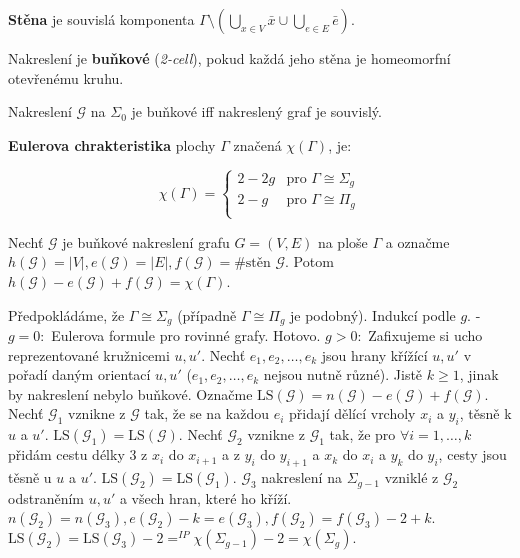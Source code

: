 \begin{definice}
	\textbf{Stěna} je souvislá komponenta $\Gamma \setminus (\bigcup_{x \in V} \bar{x} \cup \bigcup_{e \in E} \bar{e})$.
\end{definice}

\begin{definice}
	Nakreslení je \textbf{buňkové} (\textit{2-cell}), pokud každá jeho stěna je homeomorfní otevřenému kruhu.
\end{definice}

\begin{fakt}
	Nakreslení $\mathcal{G}$ na $\Sigma_{0}$ je buňkové iff nakreslený graf je souvislý.
\end{fakt}

\begin{definice}
	\textbf{Eulerova chrakteristika} plochy $\Gamma$ značená $\chi (\Gamma)$, je:
	
	$$
	\chi(\Gamma) =
	\left\{
	\begin{array}{ll}
		2 - 2g & \text{pro } \Gamma \cong \Sigma_{g} \\
		2 - g & \text{pro } \Gamma \cong \Pi_{g} \\
	\end{array}
	\right.
	$$
\end{definice}

\begin{veta}
	Nechť $\mathcal{G}$ je buňkové nakreslení grafu $G=(V,E)$ na ploše $\Gamma$ a označme $h(\mathcal{G}) = |V|, e(\mathcal{G}) = |E|, f(\mathcal{G})=\text{\# stěn }\mathcal{G}$. Potom $h(\mathcal{G}) - e(\mathcal{G}) + f(\mathcal{G}) = \chi(\Gamma)$.
\end{veta}

\begin{dukaz}
	Předpokládáme, že $\Gamma \cong \Sigma_{g}$ (případně $\Gamma \cong \Pi_{g}$ je podobný). Indukcí podle $g$.
	- $g=0:$ Eulerova formule pro rovinné grafy. Hotovo. $g>0:$ Zafixujeme si ucho reprezentované kružnicemi $u,u'$. Nechť $e_{1},e_{2},\dots,e_{k}$ jsou hrany křížící $u,u'$ v pořadí daným orientací $u,u'$ ($e_{1},e_{2}, \dots, e_{k}$ nejsou nutně různé). Jistě $k \geq 1$, jinak by nakreslení nebylo buňkové. Označme $\text{LS}(\mathcal{G}) = n(\mathcal{G}) - e(\mathcal{G}) + f(\mathcal{G})$. Nechť $\mathcal{G}_{1}$ vznikne z $\mathcal{G}$ tak, že se na každou $e_{i}$ přidají dělící vrcholy $x_{i}$ a $y_{i}$, těsně k $u$ a $u'$. $\text{LS}(\mathcal{G}_{1}) = \text{LS}(\mathcal{G})$. Nechť $\mathcal{G}_{2}$ vznikne z $\mathcal{G}_{1}$ tak, že pro $\forall i = 1, \dots , k$ přidám cestu délky 3 z $x_{i}$ do $x_{i+1}$ a z $y_{i}$ do $y_{i+1}$ a $x_{k}$ do $x_{i}$ a $y_{k}$ do $y_{i}$, cesty jsou těsně u $u$ a $u'$. $\text{LS}(\mathcal{G}_{2}) = \text{LS}(\mathcal{G}_{1})$. $\mathcal{G}_{3}$ nakreslení na $\Sigma_{g-1}$ vzniklé z $\mathcal{G}_{2}$ odstraněním $u,u'$ a všech hran, které ho kříží. $n(\mathcal{G}_{2}) = n(\mathcal{G}_{3}), e(\mathcal{G}_{2}) - k = e(\mathcal{G}_{3}), f(\mathcal{G}_{2}) = f(\mathcal{G}_{3}) - 2 + k$. $\text{LS}(\mathcal{G}_{2}) = \text{LS}(\mathcal{G}_{3}) - 2 =^{IP} \chi(\Sigma_{g-1}) - 2 = \chi(\Sigma_{g})$.
\end{dukaz}

